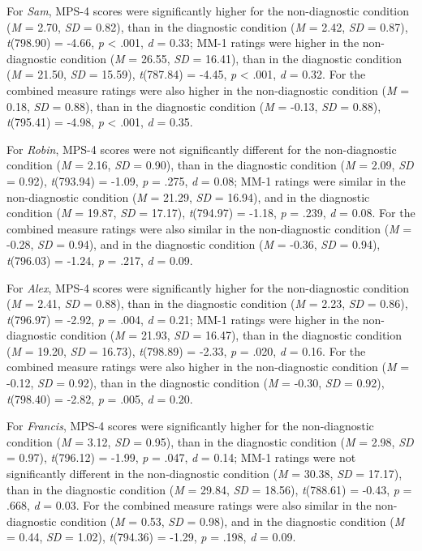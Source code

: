 \documentclass[
  man,floatsintext]{apa6}
\begin{document}
For \emph{Sam}, MPS-4 scores were significantly higher for the non-diagnostic condition (\emph{M} = 2.70, \emph{SD} = 0.82), than in the diagnostic condition (\emph{M} = 2.42, \emph{SD} = 0.87), \emph{t}(798.90) = -4.66, \emph{p} \textless{} .001, \emph{d} = 0.33; MM-1 ratings were higher in the non-diagnostic condition (\emph{M} = 26.55, \emph{SD} = 16.41), than in the diagnostic condition (\emph{M} = 21.50, \emph{SD} = 15.59), \emph{t}(787.84) = -4.45, \emph{p} \textless{} .001, \emph{d} = 0.32. For the combined measure ratings were also higher in the non-diagnostic condition (\emph{M} = 0.18, \emph{SD} = 0.88), than in the diagnostic condition (\emph{M} = -0.13, \emph{SD} = 0.88), \emph{t}(795.41) = -4.98, \emph{p} \textless{} .001, \emph{d} = 0.35.

For \emph{Robin}, MPS-4 scores were not significantly different for the non-diagnostic condition (\emph{M} = 2.16, \emph{SD} = 0.90), than in the diagnostic condition (\emph{M} = 2.09, \emph{SD} = 0.92), \emph{t}(793.94) = -1.09, \emph{p} = .275, \emph{d} = 0.08; MM-1 ratings were similar in the non-diagnostic condition (\emph{M} = 21.29, \emph{SD} = 16.94), and in the diagnostic condition (\emph{M} = 19.87, \emph{SD} = 17.17), \emph{t}(794.97) = -1.18, \emph{p} = .239, \emph{d} = 0.08. For the combined measure ratings were also similar in the non-diagnostic condition (\emph{M} = -0.28, \emph{SD} = 0.94), and in the diagnostic condition (\emph{M} = -0.36, \emph{SD} = 0.94), \emph{t}(796.03) = -1.24, \emph{p} = .217, \emph{d} = 0.09.

For \emph{Alex}, MPS-4 scores were significantly higher for the non-diagnostic condition (\emph{M} = 2.41, \emph{SD} = 0.88), than in the diagnostic condition (\emph{M} = 2.23, \emph{SD} = 0.86), \emph{t}(796.97) = -2.92, \emph{p} = .004, \emph{d} = 0.21; MM-1 ratings were higher in the non-diagnostic condition (\emph{M} = 21.93, \emph{SD} = 16.47), than in the diagnostic condition (\emph{M} = 19.20, \emph{SD} = 16.73), \emph{t}(798.89) = -2.33, \emph{p} = .020, \emph{d} = 0.16. For the combined measure ratings were also higher in the non-diagnostic condition (\emph{M} = -0.12, \emph{SD} = 0.92), than in the diagnostic condition (\emph{M} = -0.30, \emph{SD} = 0.92), \emph{t}(798.40) = -2.82, \emph{p} = .005, \emph{d} = 0.20.

For \emph{Francis}, MPS-4 scores were significantly higher for the non-diagnostic condition (\emph{M} = 3.12, \emph{SD} = 0.95), than in the diagnostic condition (\emph{M} = 2.98, \emph{SD} = 0.97), \emph{t}(796.12) = -1.99, \emph{p} = .047, \emph{d} = 0.14; MM-1 ratings were not significantly different in the non-diagnostic condition (\emph{M} = 30.38, \emph{SD} = 17.17), than in the diagnostic condition (\emph{M} = 29.84, \emph{SD} = 18.56), \emph{t}(788.61) = -0.43, \emph{p} = .668, \emph{d} = 0.03. For the combined measure ratings were also similar in the non-diagnostic condition (\emph{M} = 0.53, \emph{SD} = 0.98), and in the diagnostic condition (\emph{M} = 0.44, \emph{SD} = 1.02), \emph{t}(794.36) = -1.29, \emph{p} = .198, \emph{d} = 0.09.
\end{document}
